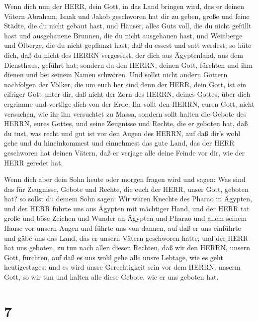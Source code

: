  Wenn dich nun der HERR, dein Gott, in das Land bringen
wird, das er deinen Vätern Abraham, Isaak und Jakob geschworen hat dir
zu geben, große und feine Städte, die du nicht gebaut hast,
 und Häuser, alles Guts voll, die du nicht gefüllt hast und
ausgehauene Brunnen, die du nicht ausgehauen hast, und Weinberge und
Ölberge, die du nicht gepflanzt hast, daß du essest und satt werdest;
 so hüte dich, daß du nicht des HERRN vergessest, der dich
aus Ägyptenland, aus dem Diensthaus, geführt hat;  sondern
du den HERRN, deinen Gott, fürchten und ihm dienen und bei seinem Namen
schwören.  Und sollst nicht andern Göttern nachfolgen der
Völker, die um euch her sind  denn der HERR, dein Gott, ist
ein eifriger Gott unter dir, daß nicht der Zorn des HERRN, deines
Gottes, über dich ergrimme und vertilge dich von der Erde. 
Ihr sollt den HERRN, euren Gott, nicht versuchen, wie ihr ihn versuchtet
zu Massa,  sondern sollt halten die Gebote des HERRN, eures
Gottes, und seine Zeugnisse und Rechte, die er geboten hat,
 daß du tust, was recht und gut ist vor den Augen des
HERRN, auf daß dir's wohl gehe und du hineinkommest und einnehmest das
gute Land, das der HERR geschworen hat deinen Vätern,  daß
er verjage alle deine Feinde vor dir, wie der HERR geredet hat.

 Wenn dich aber dein Sohn heute oder morgen fragen wird und
sagen: Was sind das für Zeugnisse, Gebote und Rechte, die euch der HERR,
unser Gott, geboten hat?  so sollst du deinem Sohn sagen:
Wir waren Knechte des Pharao in Ägypten, und der HERR führte uns aus
Ägypten mit mächtiger Hand,  und der HERR tat große und
böse Zeichen und Wunder an Ägypten und Pharao und allem seinem Hause vor
unsern Augen  und führte uns von dannen, auf daß er uns
einführte und gäbe uns das Land, das er unsern Vätern geschworen hatte;
 und der HERR hat uns geboten, zu tun nach allen diesen
Rechten, daß wir den HERRN, unsern Gott, fürchten, auf daß es uns wohl
gehe alle unsre Lebtage, wie es geht heutigestages;  und es
wird unsre Gerechtigkeit sein vor dem HERRN, unserm Gott, so wir tun und
halten alle diese Gebote, wie er uns geboten hat.

\hypertarget{section-6}{%
\section{7}\label{section-6}}


